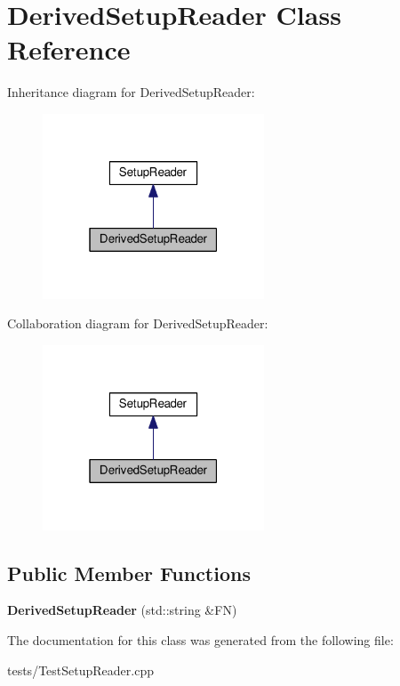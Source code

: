 \hypertarget{classDerivedSetupReader}{}\section{Derived\+Setup\+Reader Class Reference}
\label{classDerivedSetupReader}


Inheritance diagram for Derived\+Setup\+Reader\+:
\nopagebreak
\begin{figure}[H]
\begin{center}
\leavevmode
\includegraphics[width=187pt]{classDerivedSetupReader__inherit__graph}
\end{center}
\end{figure}


Collaboration diagram for Derived\+Setup\+Reader\+:
\nopagebreak
\begin{figure}[H]
\begin{center}
\leavevmode
\includegraphics[width=187pt]{classDerivedSetupReader__coll__graph}
\end{center}
\end{figure}
\subsection*{Public Member Functions}
\begin{DoxyCompactItemize}
\item 
{\bfseries Derived\+Setup\+Reader} (std\+::string \&FN)\hypertarget{classDerivedSetupReader_a448acbcfdc7338dc35caa99af0b52dde}{}\label{classDerivedSetupReader_a448acbcfdc7338dc35caa99af0b52dde}

\end{DoxyCompactItemize}


The documentation for this class was generated from the following file\+:\begin{DoxyCompactItemize}
\item 
tests/Test\+Setup\+Reader.\+cpp\end{DoxyCompactItemize}
